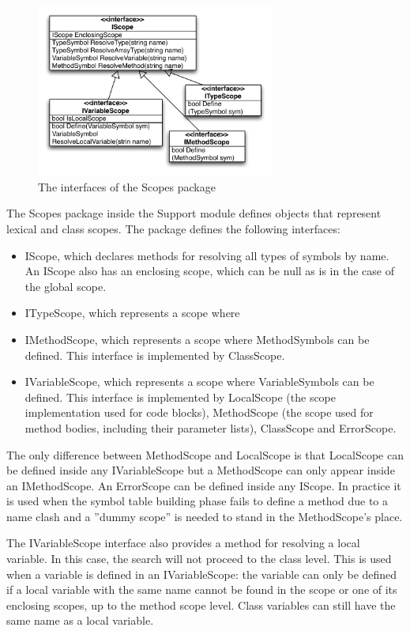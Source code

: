 \documentclass[a4paper,11pt]{article}
\begin{document}
\begin{figure}[h!]
\centering
\includegraphics[width=0.7\textwidth]{scopes.pdf}
\caption{The interfaces of the Scopes package}
\end{figure}

The Scopes package inside the Support module defines objects that represent lexical and class scopes. The package defines the following interfaces:
\begin{itemize}
    \item IScope, which declares methods for resolving all types of symbols by name. An IScope also has an enclosing scope, which can be null as is in the case of the global scope.
    \item ITypeScope, which represents a scope where 
    \item IMethodScope, which represents a scope where MethodSymbols can be defined. This interface is implemented by ClassScope.
    \item IVariableScope, which represents a scope where VariableSymbols can be defined. This interface is implemented by LocalScope (the scope implementation used for code blocks), MethodScope (the scope used for method bodies, including their parameter lists), ClassScope and ErrorScope.
\end{itemize}

The only difference between MethodScope and LocalScope is that LocalScope can be defined inside any IVariableScope but a MethodScope can only appear inside an IMethodScope. An ErrorScope can be defined inside any IScope. In practice it is used when the symbol table building phase fails to define a method due to a name clash and a ''dummy scope'' is needed to stand in the MethodScope's place.

The IVariableScope interface also provides a method for resolving a local variable. In this case, the search will not proceed to the class level. This is used when a variable is defined in an IVariableScope: the variable can only be defined if a local variable with the same name cannot be found in the scope or one of its enclosing scopes, up to the method scope level. Class variables can still have the same name as a local variable.
\end{document}
